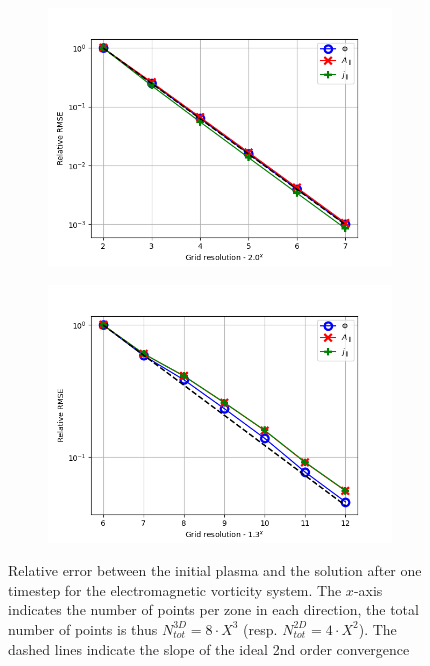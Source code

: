 \begin{figure}[H]
	\centering
	\begin{subfigure}[b]{0.49\textwidth}
		\centering
		\includegraphics[width=1\textwidth]{schemes/err_rel_vortAParaJParaSystem_grid1_2D.png}
		\label{fig:MMSTorturedVortAPara2DConvergence}
	\end{subfigure}
	\begin{subfigure}[b]{0.49\textwidth}
		\centering
		\includegraphics[width=1\textwidth]{schemes/err_rel_vortAParaJParaSystem_grid2_3D.png}
		\label{fig:MMSTorturedVortAPara3DConvergence}
	\end{subfigure}
	\caption{Relative error between the initial plasma and the solution after one timestep for the electromagnetic vorticity system. The $x$-axis indicates the number of points per zone in each direction, the total number of points is thus $N_{tot}^{3D} = 8\cdot X^3$ (resp. $N_{tot}^{2D} = 4\cdot X^2$). The dashed lines indicate the slope of the ideal 2nd order convergence}
	\label{fig:MMSTorturedVortAParaConvergence}
\end{figure}



